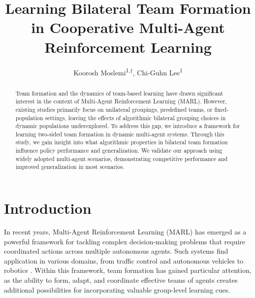 \documentclass[10pt]{article} %
\title{Learning Bilateral Team Formation in Cooperative Multi-Agent Reinforcement Learning}
\author{Koorosh Moslemi\textsuperscript{1,$\dagger$}, Chi-Guhn Lee\textsuperscript{1}}
\begin{document}
\makeCover  %
\maketitle  %

\begin{abstract}
Team formation and the dynamics of team-based learning have drawn significant interest in the context of Multi-Agent Reinforcement Learning (MARL). However, existing studies primarily focus on unilateral groupings, predefined teams, or fixed-population settings, leaving the effects of algorithmic bilateral grouping choices in dynamic populations underexplored. To address this gap, we introduce a framework for learning two-sided team formation in dynamic multi-agent systems. Through this study, we gain insight into what algorithmic properties in bilateral team formation influence policy performance and generalization. We validate our approach using widely adopted multi-agent scenarios, demonstrating competitive performance and improved generalization in most scenarios.
\end{abstract}


\section{Introduction}

In recent years, Multi-Agent Reinforcement Learning (MARL) has emerged as a powerful framework for tackling complex decision-making problems that require coordinated actions across multiple autonomous agents. Such systems find application in various domains, from traffic control \citep{zhang2024field} and autonomous vehicles \citep{lee2025traffic} to robotics \citep{krnjaic2024scalable}. Within this framework, team formation has gained particular attention, as the ability to form, adapt, and coordinate effective teams of agents creates additional possibilities for incorporating valuable group-level learning cues.
\end{document}
